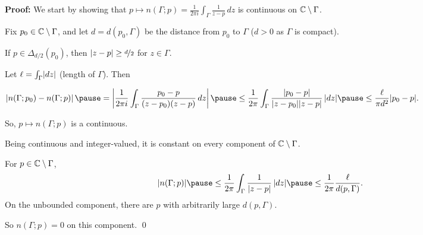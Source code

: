 \documentclass[10pt,aspectratio=169]{beamer}
\begin{document}
\begin{frame}
\textbf{Proof:}
We start by showing that
$\displaystyle
p \mapsto n(\Gamma;p) = \frac{1}{2\pi i} \int_\Gamma \frac{1}{z-p} \, dz
$
is continuous on ${\mathbb{C}} \setminus \Gamma$.

\medskip
\pause

Fix $p_0 \in {\mathbb{C}} \setminus \Gamma$, and let
$d = d(p_0,\Gamma)$ be the
distance from 
$p_0$ to $\Gamma$ ($d > 0$ as $\Gamma$ is compact).

\medskip
\pause

If $p \in \Delta_{d/2}(p_0)$, then $\lvert {z-p} \rvert \geq \nicefrac{d}{2}$ for $z \in \Gamma$.

\medskip
\pause
Let $\ell = \int_\Gamma \lvert {dz} \rvert$ (length of $\Gamma$). \pause Then

\medskip
$\displaystyle
\abs{n(\Gamma;p_0)-n(\Gamma;p)}
\pause
=
\abs{\frac{1}{2\pi i} \int_\Gamma \frac{p_0-p}{(z-p_0)(z-p)} \, dz}
\pause
\leq
\frac{1}{2\pi} \int_\Gamma \frac{\sabs{p_0-p}}{\sabs{z-p_0}\sabs{z-p}} \, \sabs{dz}
%
\pause
\leq 
\frac{\ell}{\pi {d}^2} \sabs{p_0-p} .
$

\pause
\medskip
So, $p \mapsto n(\Gamma;p)$ is a continuous.

\medskip
\pause

Being continuous and integer-valued, it is constant on every component
of ${\mathbb{C}} \setminus \Gamma$.

\medskip
\pause

For $p \in {\mathbb{C}} \setminus \Gamma$,
\[
\sabs{n(\Gamma;p)}
\pause
\leq
\frac{1}{2\pi} \int_\Gamma \frac{1}{\sabs{z-p}} \, \sabs{dz}
\pause
\leq \frac{1}{2\pi} \frac{\ell}{d(p,\Gamma)} .
\]
\pause
On the unbounded component,
there are $p$ with arbitrarily large
$d(p,\Gamma)$.

\medskip
\pause

So $n(\Gamma;p)=0$ on this component.
\qed
\end{frame}
\end{document}
